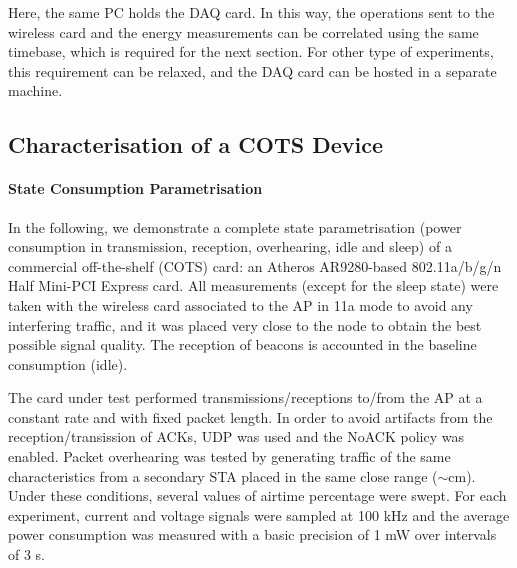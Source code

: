 \documentclass[twoside,nohyper]{tufte-book}
\begin{document}
Here, the same PC holds the DAQ card. In this way, the operations sent to the wireless card and the energy measurements can be correlated using the same timebase, which is required for the next section. For other type of experiments, this requirement can be relaxed, and the DAQ card can be hosted in a separate machine.

\hypertarget{characterisation-of-a-cots-device}{%
\subsection{Characterisation of a COTS Device}\label{characterisation-of-a-cots-device}}

\hypertarget{state-consumption-parametrisation}{%
\paragraph{State Consumption Parametrisation}\label{state-consumption-parametrisation}}

In the following, we demonstrate a complete state parametrisation (power consumption in transmission, reception, overhearing, idle and sleep) of a commercial off-the-shelf (COTS) card: an Atheros AR9280-based 802.11a/b/g/n Half Mini-PCI Express card. All measurements (except for the sleep state) were taken with the wireless card associated to the AP in 11a mode to avoid any interfering traffic, and it was placed very close to the node to obtain the best possible signal quality. The reception of beacons is accounted in the baseline consumption (idle).

The card under test performed transmissions/receptions to/from the AP at a constant rate and with fixed packet length. In order to avoid artifacts from the reception/transission of ACKs, UDP was used and the NoACK policy was enabled. Packet overhearing was tested by generating traffic of the same characteristics from a secondary STA placed in the same close range (\(\sim\)cm). Under these conditions, several values of airtime percentage were swept. For each experiment, current and voltage signals were sampled at 100 kHz and the average power consumption was measured with a basic precision of 1 mW over intervals of 3 s.

\pagebreak
\end{document}
